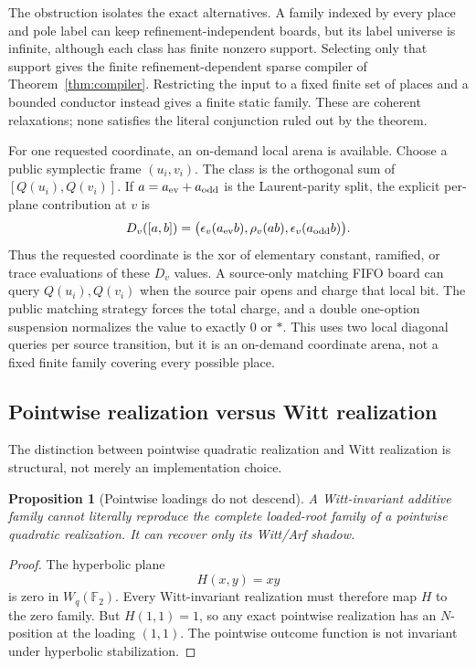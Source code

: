 \documentclass[11pt]{article}
\newtheorem{proposition}[theorem]{Proposition}
\theoremstyle{definition}
\theoremstyle{remark}
\newcommand{\F}{\mathbb{F}}
\begin{document}
The obstruction isolates the exact alternatives.  A family indexed by every
place and pole label can keep refinement-independent boards, but its label
universe is infinite, although each class has finite nonzero support.
Selecting only that support gives the finite refinement-dependent sparse
compiler of Theorem~\ref{thm:compiler}.  Restricting the input to a fixed
finite set of places and a bounded conductor instead gives a finite static
family.  These are coherent relaxations; none satisfies the literal
conjunction ruled out by the theorem.

For one requested coordinate, an on-demand local arena is available.  Choose
a public symplectic frame $(u_i,v_i)$.  The class is the orthogonal sum of
$[Q(u_i),Q(v_i)]$.  If $a=a_{\rm ev}+a_{\rm odd}$ is the Laurent-parity split,
the explicit per-plane contribution at $v$ is
\[
D_v([a,b])=
\bigl(\epsilon_v(a_{\rm ev}b),\rho_v(ab),
      \epsilon_v(a_{\rm odd}b)\bigr).
\]
Thus the requested coordinate is the xor of elementary constant, ramified, or
trace evaluations of these $D_v$ values.  A source-only matching FIFO board
can query $Q(u_i),Q(v_i)$ when the source pair opens and charge that local bit.
The public matching strategy forces the total charge, and a double one-option
suspension normalizes the value to exactly $0$ or $*$.  This uses two local
diagonal queries per source transition, but it is an on-demand coordinate
arena, not a fixed finite family covering every possible place.

\subsection{Pointwise realization versus Witt realization}

The distinction between pointwise quadratic realization and Witt realization
is structural, not merely an implementation choice.

\begin{proposition}[Pointwise loadings do not descend]\label{prop:gold}
A Witt-invariant additive family cannot literally reproduce the complete
loaded-root family of a pointwise quadratic realization.  It can recover only
its Witt/Arf shadow.
\end{proposition}

\begin{proof}
The hyperbolic plane
\[
H(x,y)=xy
\]
is zero in $W_q(\F_2)$.  Every Witt-invariant realization must therefore map
$H$ to the zero family.  But $H(1,1)=1$, so any exact pointwise realization
has an $N$-position at the loading $(1,1)$.  The pointwise outcome function is
not invariant under hyperbolic stabilization.
\end{proof}
\end{document}
